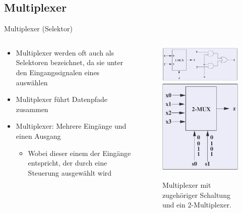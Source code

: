 \documentclass[12pt%
,xcolor=table
,aspectratio=169%
]{beamer}
\begin{document}
\subsection{Multiplexer}
\begin{frame}{Multiplexer (Selektor)}
\begin{columns}[T] %
\begin{column}{.58\textwidth}
\begin{itemize}
	\item Multiplexer werden oft auch als Selektoren bezeichnet, da sie unter den Eingangssignalen eines auswählen
	\item Mulitplexer führt Datenpfade zusammen
	\item Multiplexer: Mehrere Eingänge und einen Ausgang
	\begin{itemize}
		\item Wobei dieser einem der Eingänge entspricht, der durch eine Steuerung ausgewählt wird
	\end{itemize}
\end{itemize}
\end{column}%
\hfill%
\begin{column}{.48\textwidth}
\centering
\vspace*{-1.7cm}
\begin{figure}
\includegraphics[scale=0.35]{pictures/mux1}\\
\includegraphics[scale=0.35]{pictures/mux2}
\caption{Multiplexer mit zugehöriger Schaltung und ein 2-Multiplexer.}
\end{figure}
\end{column}%
\end{columns}
\end{frame}
\end{document}
